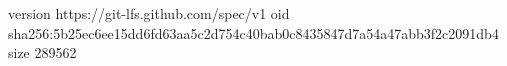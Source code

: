 version https://git-lfs.github.com/spec/v1
oid sha256:5b25ec6ee15dd6fd63aa5c2d754c40bab0c8435847d7a54a47abb3f2c2091db4
size 289562
